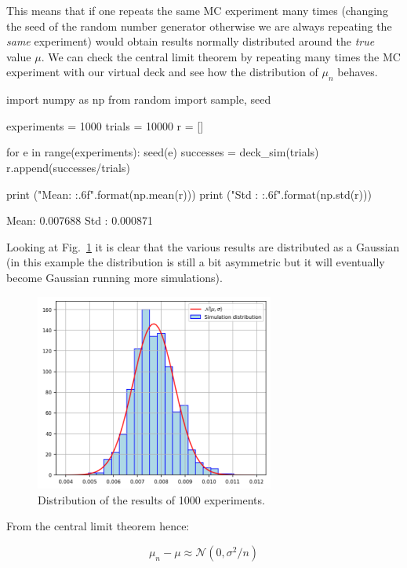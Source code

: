 This means that if one repeats the same MC experiment many times (changing the seed of the random number generator otherwise we are always repeating the \emph{same} experiment) would obtain results normally distributed around the \emph{true} value \(\mu\).
We can check the central limit theorem by repeating many times the MC experiment with our virtual deck and see how the distribution of $\mu_n$ behaves.

\begin{ipython}
import numpy as np
from random import sample, seed

experiments = 1000
trials = 10000
r = []

for e in range(experiments):
	seed(e)
    successes = deck_sim(trials)
    r.append(successes/trials)

print ("Mean: {:.6f}".format(np.mean(r)))
print ("Std : {:.6f}".format(np.std(r)))
\end{ipython}
\begin{ioutput}
Mean:  0.007688
Std :  0.000871
\end{ioutput}

Looking at Fig.~\ref{fig:repeated_MC} it is clear that the various results are distributed as a Gaussian (in this example the distribution is still a bit asymmetric but it will eventually become Gaussian running more simulations).

\begin{figure}[htb]
\centering
\includegraphics[width=0.7\textwidth]{figures/experiment_distribution}
\caption{Distribution of the results of 1000 experiments.}
\label{fig:repeated_MC}
\end{figure}

From the central limit theorem hence: 

\begin{equation}
\mu_n - \mu \approx \mathcal{N}(0, \sigma^2/n)
\end{equation}

